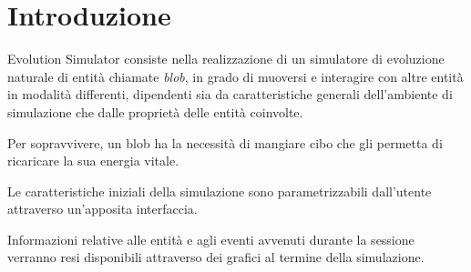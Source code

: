 \section{Introduzione}
Evolution Simulator consiste nella realizzazione di un simulatore di evoluzione naturale di entità chiamate \textit{blob}, in grado di muoversi e interagire con altre entità in modalità differenti, dipendenti sia da caratteristiche generali dell'ambiente di simulazione che dalle proprietà delle entità coinvolte.

Per sopravvivere, un blob ha la necessità di mangiare cibo che gli permetta di ricaricare la sua energia vitale.

Le caratteristiche iniziali della simulazione sono parametrizzabili dall'utente attraverso un'apposita interfaccia.

Informazioni relative alle entità e agli eventi avvenuti durante la sessione verranno resi disponibili attraverso dei grafici al termine della simulazione.